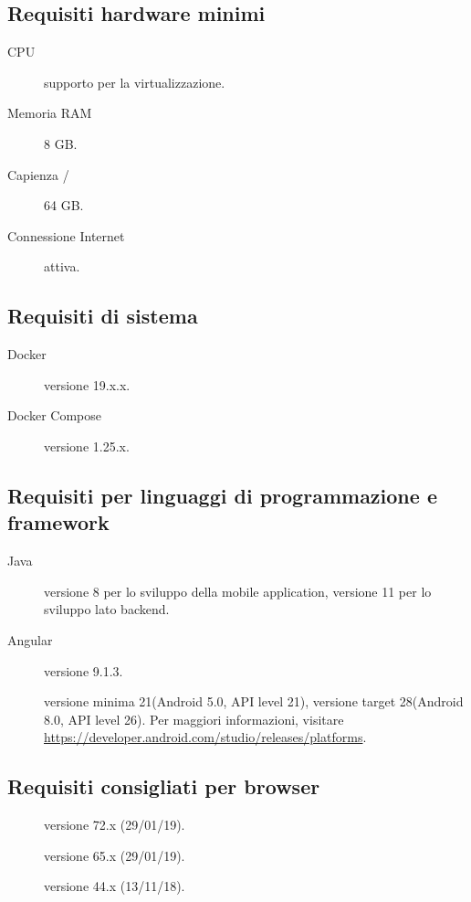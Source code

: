 \documentclass[../../../manuale-manutentore.tex]{subfiles}
\begin{document}
\subsection{Requisiti hardware minimi}%
\label{sub:requisiti_hardware_minimi}

\begin{description}
    \item[CPU] supporto per la virtualizzazione.
    \item[Memoria RAM] 8 GB\@.
    \item[Capienza /] 64 GB\@.
    \item[Connessione Internet] attiva.
\end{description}

\subsection{Requisiti di sistema}%
\label{sub:requisiti_di_sistema}

\begin{description}
    \item[Docker] versione 19.x.x.
    \item[Docker Compose] versione 1.25.x.
\end{description}

\subsection{Requisiti per linguaggi di programmazione e framework}%
\label{sub:requisiti_per_linguaggi_di_programmazione_e_framwework}

\begin{description}
  \item[Java] versione 8 per lo sviluppo della mobile application, versione 11 per lo sviluppo lato backend.
  \item[Angular] versione 9.1.3.
  \item[] versione minima 21(Android 5.0, API level 21), versione target 28(Android 8.0, API level 26). Per maggiori informazioni, visitare \href{https://developer.android.com/studio/releases/platforms}{https://developer.android.com/studio/releases/platforms}.
\end{description}

\subsection{Requisiti consigliati per browser}%
\label{sub:requisiti_consigliati per browser}

\begin{description}
  \item[] versione 72.x (29/01/19).
  \item[] versione 65.x (29/01/19).
  \item[] versione 44.x (13/11/18).
\end{description}
\end{document}
